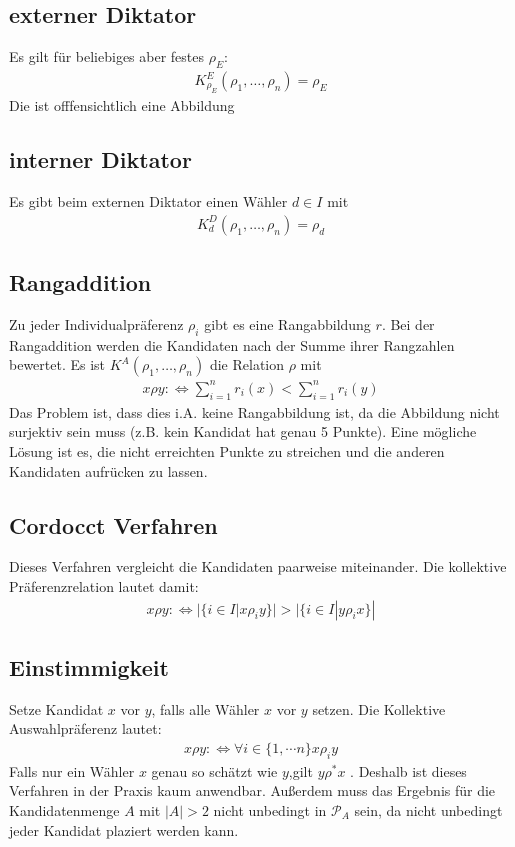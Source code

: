 \subsection{externer Diktator}
Es gilt für beliebiges aber festes $\rho_E$: 
\begin{align*}
	K_{\rho_E}^E(\rho_1, \dots, \rho_n)= \rho_E
\end{align*}
Die ist offfensichtlich eine Abbildung

\subsection{interner Diktator}
Es gibt beim externen Diktator einen Wähler $d \in I$ mit 
\begin{align*}
	K_d^D(\rho_1, \dots, \rho_n)= \rho_d
\end{align*}

\subsection{Rangaddition}
Zu jeder Individualpräferenz $\rho_i$ gibt es eine Rangabbildung $r$. Bei der Rangaddition werden die Kandidaten 
nach der Summe ihrer Rangzahlen bewertet. Es ist $K^A(\rho_1, \dots, \rho_n)$ die Relation $\rho$ mit
\begin{align*}
	x \rho y : \Leftrightarrow \sum_{i=1}^n r_i(x) < \sum_{i=1}^n r_i(y)
\end{align*}
Das Problem ist, dass dies i.A. keine Rangabbildung ist, da die Abbildung nicht surjektiv sein muss (z.B. kein Kandidat hat genau 5 Punkte). Eine mögliche Lösung ist es, die nicht erreichten Punkte zu streichen und die anderen Kandidaten aufrücken zu lassen. 

\subsection{Cordocct Verfahren} 
Dieses Verfahren vergleicht die Kandidaten paarweise miteinander. Die kollektive Präferenzrelation lautet damit:
\begin{align*}
	x \rho y :\Leftrightarrow |\{i\in I | x \rho_i y \} | > |\{i \in I | y \rho_i x\} |
\end{align*} 

\subsection{Einstimmigkeit}
Setze Kandidat $x$ vor $y$, falls alle Wähler $x$ vor $y$ setzen. Die Kollektive Auswahlpräferenz lautet:
\begin{align*}
	x \rho y : \Leftrightarrow \forall i \in \{1, \cdots n\} x \rho_i y
\end{align*}
Falls nur ein Wähler $x$ genau so schätzt wie $y$,gilt $y \rho^* x$  .
Deshalb ist dieses Verfahren in der Praxis kaum anwendbar. Außerdem muss das Ergebnis für die Kandidatenmenge $A$ mit $|A|>2$ nicht unbedingt in $\mathcal{P}_A$ sein, da nicht unbedingt jeder Kandidat plaziert werden kann. 


